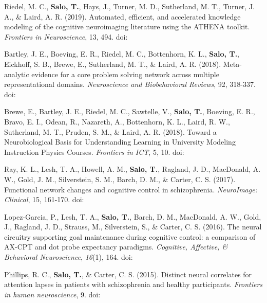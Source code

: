 \documentclass[10pt]{article}
\newcommand{\textlink}[3][blue]{\href{#2}{\color{#1}{#3}}}
\begin{document}
\begin{hangparas}{.25in}{1}

	Riedel, M. C., \textbf{Salo, T.}, Hays, J., Turner, M. D., Sutherland, M. T.,
	Turner, J. A., \& Laird, A. R. (2019).
	Automated, efficient, and accelerated knowledge modeling of the cognitive
	neuroimaging literature using the ATHENA toolkit.
	\emph{Frontiers in Neuroscience}, 13, 494.
	doi:\textlink{https://doi.org/10.3389/fnins.2019.00494}{10.3389/fnins.2019.00494}

	\bigskip

	Bartley, J. E., Boeving, E. R., Riedel, M. C., Bottenhorn, K. L.,
	\textbf{Salo, T.}, Eickhoff, S. B., Brewe, E., Sutherland, M. T.,
	\& Laird, A. R. (2018).
	Meta-analytic evidence for a core problem solving network across multiple
	representational domains. \emph{Neuroscience and Biobehavioral Reviews}, 92, 318-337.
	doi:\textlink{https://doi.org/10.1016/j.neubiorev.2018.06.009}{10.1016/j.neubiorev.2018.06.009}

	\bigskip

	Brewe, E., Bartley, J. E., Riedel, M. C., Sawtelle, V., \textbf{Salo, T.},
	Boeving, E. R., Bravo, E. I., Odean, R., Nazareth, A., Bottenhorn, K. L.,
	Laird, R. W., Sutherland, M. T., Pruden, S. M., \& Laird, A. R. (2018).
	Toward a Neurobiological Basis for Understanding Learning in University Modeling
	Instruction Physics Courses. \emph{Frontiers in ICT}, 5, 10.
	doi:\textlink{https://doi.org/10.3389/fict.2018.00010}{10.3389/fict.2018.00010}

	\bigskip

	Ray, K. L., Lesh, T. A., Howell, A. M., \textbf{Salo, T.}, Ragland, J. D.,
	MacDonald, A. W., Gold, J. M., Silverstein, S. M., Barch, D. M., \& Carter,
	C. S. (2017). Functional network changes and cognitive control in schizophrenia.
	\emph{NeuroImage: Clinical}, 15, 161-170.
	doi:\textlink{https://doi.org/10.1016/j.nicl.2017.05.001}{10.1016/j.nicl.2017.05.001}

	\bigskip

	Lopez-Garcia, P., Lesh, T. A., \textbf{Salo, T.}, Barch, D. M., MacDonald,
	A. W., Gold, J., Ragland, J. D., Strauss, M., Silverstein, S., \& Carter, C. S.
	(2016). The neural circuitry supporting goal maintenance during cognitive
	control: a comparison of AX-CPT and dot probe expectancy paradigms.
	\emph{Cognitive, Affective, \& Behavioral Neuroscience}, \emph{16}(1), 164.
	doi:\textlink{https://doi.org/10.3758/s13415-015-0384-1}{10.3758/s13415-015-0384-1}

	\bigskip

	Phillips, R. C., \textbf{Salo, T.}, \& Carter, C. S. (2015). Distinct neural
	correlates for attention lapses in patients with schizophrenia and healthy
	participants. \emph{Frontiers in human neuroscience}, 9.
	doi:\textlink{https://doi.org/10.3389/fnhum.2015.00502}{10.3389/fnhum.2015.00502}

\end{hangparas}
\end{document}
